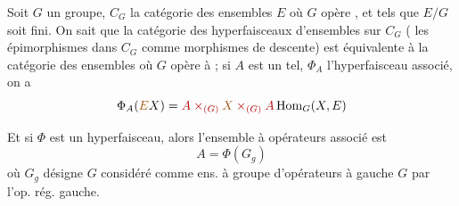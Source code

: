 Soit $G$ un groupe, $C_G$ la catégorie des ensembles $E$ où $G$ opère , et tels que $E/G$ soit fini. On sait que la catégorie des hyperfaisceaux d'ensembles sur $C_G$ ( les épimorphismes dans $C_G$ comme morphismes de descente) est équivalente à la catégorie des ensembles  où $G$ opère à   ; si $A$ est un tel, $\Phi_A$ l'hyperfaisceau associé, on a
\[
\Phi_A(\deleted{\unsure{E}}X)=\deleted{A\times_{(G)}\unsure{X}\times_{(G)}A}\operatorname{Hom}_G(X,E)
\]

Et si $\Phi$ est un hyperfaisceau, alors l'ensemble à opérateurs associé est
\[
A=\Phi(G_g)
\]
où $G_g$ désigne $G$ considéré comme ens. à groupe d'opérateurs à gauche $G$ par l'op. rég. gauche.

